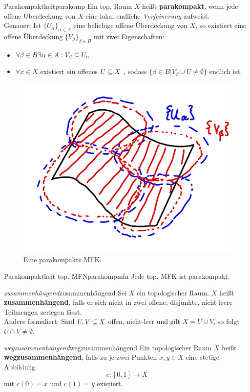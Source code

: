 \begin{definition}{Parakompaktheit}{parakomp}
Ein top. Raum $X$ heißt \textbf{parakompakt}, wenn jede offene Überdeckung von $X$ eine lokal endliche \textit{Verfeinerung} aufweist.\\
Genauer: Ist $\{U_\alpha\}_{\alpha \in A}$ eine beliebige offene Überdeckung von $X$, so existiert eine offene Überdeckung $\{V_\beta \}_{\beta \in B}$ mit zwei Eigenschaften:
\begin{itemize}
\item $\forall \beta \in B \exists \alpha \in A: V_\beta \subseteq U_\alpha$
\item $\forall x \in X$ existiert ein offenes $U \subseteq X$ , sodass $\{ \beta \in B | V_\beta \cup U \neq \emptyset \}$ endlich ist.
\end{itemize}
\begin{figure}[H]
\label{fig:parakomp}
\centering
\includegraphics[width=0.2\linewidth]{Bilder/parakompakt.png}
\caption{Eine parakompakte MFK.}
\end{figure}
\end{definition}
\begin{satz}{Parakompaktheit top. MFN}{parakompmfn}
Jede top. MFK ist parakompakt.
\end{satz}
\begin{definition}{\textit{zusammenhängend}}{zusammenhängend}
Sei $X$ ein topologischer Raum. $X$ heißt \textbf{zusammenhängend}, falls er sich nicht in zwei offene, disjunkte, nicht-leere Teilmengen zerlegen lässt.\\
Anders formuliert: Sind $U,V \subseteq X$ offen, nicht-leer und gilt $X = U \cup V$, so folgt $U \cap V \neq \emptyset$.
\end{definition}
\begin{definition}{\textit{wegzusammenhängend}}{wegzusammenhängend}
Ein topologischer Raum $X$ heißt \textbf{wegzusammenhängend}, falls zu je zwei Punkten $x,y \in X$ eine stetige Abbildung
\begin{equation}
c: [0,1] \to X
\end{equation}
mit $c(0)=x$ und $c(1)=y$ existiert.
\end{definition}
